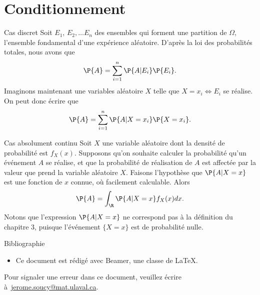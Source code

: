 \documentclass[nuit,charter,pied]{BeamerJS}
\begin{document}
\section{Conditionnement}
\begin{frame}{Cas discret}
	Soit $E_1$, $E_2,\ldots E_n$ des ensembles qui forment une partition de $\Omega$, l'ensemble fondamental d'une expérience aléatoire. D'après la loi des probabilités totales, nous avons que
	\[\P{A}=\sum_{i=1}^n\P{A|E_i}\P{E_i}.\]
	Imaginons maintenant une variables aléatoire $X$ telle que $X=x_i\iff E_i$ se réalise. On peut donc écrire que
	\[\P{A}=\sum_{i=1}^n\P{A|X=x_i}\P{X=x_i}.\]
\end{frame}
\begin{frame}{Cas absolument continu}
	Soit $X$ une variable aléatoire dont la densité de probabilité est $f_X(x)$. Supposons qu'on souhaite calculer la probabilité qu'un événement $A$ se réalise, et que la probabilité de réalisation de $A$ est affectée par la valeur que prend la variable aléatoire $X$. Faisons l'hypothèse que $\P{A|X=x}$ est une fonction de $x$ connue, où facilement calculable. Alors
	\[\P{A}=\int_{\R}\P{A|X=x}f_X(x)dx.\]
	Notons que l'expression \(\P{A|X=x}\) ne correspond pas à la définition du chapitre 3, puisque l'événement $\{X=x\}$ est de probabilité nulle.
\end{frame}
\begin{frame}[allowframebreaks]{Bibliographie}
\printbibliography[heading=none]
\vspace{0.5cm}

 \begin{rems}
 	\begin{itemize}
 		\item Ce document est rédigé avec Beamer, une classe de \LaTeX.
 	\end{itemize}
 \end{rems}

 	\vfill
 	\footnotesize Pour signaler une erreur dans ce document, veuillez écrire à~\href{mailto:jerome.soucy@mat.ulaval.ca}{jerome.soucy@mat.ulaval.ca}.
 \end{frame}
\end{document}
